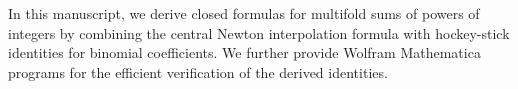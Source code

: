 In this manuscript, we derive closed formulas for multifold sums of powers of integers by combining the central Newton interpolation formula with hockey-stick identities for binomial coefficients. We further provide Wolfram Mathematica programs for the efficient verification of the derived identities.

